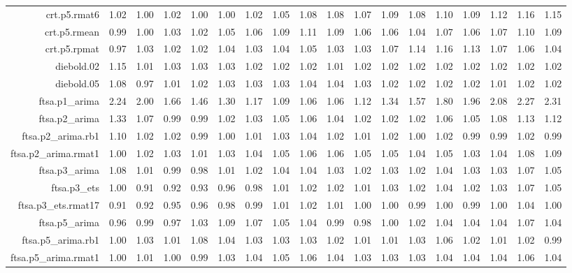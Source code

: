 \begin{tabular}{rrrrrrrrrrrrrrrrrr}
  crt.p5.rmat6 & 1.02 & 1.00 & 1.02 & 1.00 & 1.00 & 1.02 & 1.05 & 1.08 & 1.08 & 1.07 & 1.09 & 1.08 & 1.10 & 1.09 & 1.12 & 1.16 & 1.15 \\ 
  crt.p5.rmean & 0.99 & 1.00 & 1.03 & 1.02 & 1.05 & 1.06 & 1.09 & 1.11 & 1.09 & 1.06 & 1.06 & 1.04 & 1.07 & 1.06 & 1.07 & 1.10 & 1.09 \\ 
  crt.p5.rpmat & 0.97 & 1.03 & 1.02 & 1.02 & 1.04 & 1.03 & 1.04 & 1.05 & 1.03 & 1.03 & 1.07 & 1.14 & 1.16 & 1.13 & 1.07 & 1.06 & 1.04 \\ 
  diebold.02 & 1.15 & 1.01 & 1.03 & 1.03 & 1.03 & 1.02 & 1.02 & 1.02 & 1.01 & 1.02 & 1.02 & 1.02 & 1.02 & 1.02 & 1.02 & 1.02 & 1.02 \\ 
  diebold.05 & 1.08 & 0.97 & 1.01 & 1.02 & 1.03 & 1.03 & 1.03 & 1.04 & 1.04 & 1.03 & 1.02 & 1.02 & 1.02 & 1.02 & 1.01 & 1.02 & 1.02 \\ 
  ftsa.p1\_arima & 2.24 & 2.00 & 1.66 & 1.46 & 1.30 & 1.17 & 1.09 & 1.06 & 1.06 & 1.12 & 1.34 & 1.57 & 1.80 & 1.96 & 2.08 & 2.27 & 2.31 \\ 
  ftsa.p2\_arima & 1.33 & 1.07 & 0.99 & 0.99 & 1.02 & 1.03 & 1.05 & 1.06 & 1.04 & 1.02 & 1.02 & 1.02 & 1.06 & 1.05 & 1.08 & 1.13 & 1.12 \\ 
  ftsa.p2\_arima.rb1 & 1.10 & 1.02 & 1.02 & 0.99 & 1.00 & 1.01 & 1.03 & 1.04 & 1.02 & 1.01 & 1.02 & 1.00 & 1.02 & 0.99 & 0.99 & 1.02 & 0.99 \\ 
  ftsa.p2\_arima.rmat1 & 1.00 & 1.02 & 1.03 & 1.01 & 1.03 & 1.04 & 1.05 & 1.06 & 1.06 & 1.05 & 1.05 & 1.04 & 1.05 & 1.03 & 1.04 & 1.08 & 1.09 \\ 
  ftsa.p3\_arima & 1.08 & 1.01 & 0.99 & 0.98 & 1.01 & 1.02 & 1.04 & 1.04 & 1.03 & 1.02 & 1.03 & 1.02 & 1.04 & 1.03 & 1.03 & 1.07 & 1.05 \\ 
  ftsa.p3\_ets & 1.00 & 0.91 & 0.92 & 0.93 & 0.96 & 0.98 & 1.01 & 1.02 & 1.02 & 1.01 & 1.03 & 1.02 & 1.04 & 1.02 & 1.03 & 1.07 & 1.05 \\ 
  ftsa.p3\_ets.rmat17 & 0.91 & 0.92 & 0.95 & 0.96 & 0.98 & 0.99 & 1.01 & 1.02 & 1.01 & 1.00 & 1.00 & 0.99 & 1.00 & 0.99 & 1.00 & 1.04 & 1.00 \\ 
  ftsa.p5\_arima & 0.96 & 0.99 & 0.97 & 1.03 & 1.09 & 1.07 & 1.05 & 1.04 & 0.99 & 0.98 & 1.00 & 1.02 & 1.04 & 1.04 & 1.04 & 1.07 & 1.04 \\ 
  ftsa.p5\_arima.rb1 & 1.00 & 1.03 & 1.01 & 1.08 & 1.04 & 1.03 & 1.03 & 1.03 & 1.02 & 1.01 & 1.01 & 1.03 & 1.06 & 1.02 & 1.01 & 1.02 & 0.99 \\ 
  ftsa.p5\_arima.rmat1 & 1.00 & 1.01 & 1.00 & 0.99 & 1.03 & 1.04 & 1.05 & 1.06 & 1.04 & 1.03 & 1.03 & 1.03 & 1.04 & 1.04 & 1.04 & 1.06 & 1.04 \\ 

\end{tabular}
